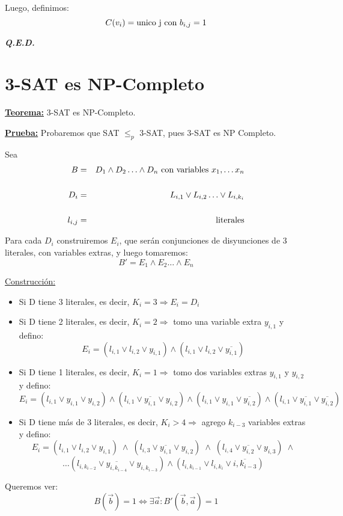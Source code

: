 \documentclass[12pt,a4paper]{report}
\newcommand{\QED}{\hfill \textit{\textbf{Q.E.D.}}}
\begin{document}
				\vspace{3mm}
				\par Luego, definimos:
				\[ C(v_{i}) = \textup{unico j con } b_{i, j} = 1\]

		\QED

	\section{3-SAT es NP-Completo}
		\textbf{\underline{Teorema:}} 3-SAT es NP-Completo.

		\textbf{\underline{Prueba:}} Probaremos que SAT $\leq_{p}$ 3-SAT, pues 3-SAT es NP Completo.

			\vspace{3mm}
			\par Sea
			\begin{eqnarray}
				B &=& D_{1} \wedge D_{2} \dotsc \wedge D_{n} \textup{ con variables } x_{1}, \dotsc x_{n} \\
				\nonumber \\
				D_{i} &=& L_{i, 1} \vee L_{i, 2} \dotsc \vee L_{i, k_{i}} \\
				\nonumber \\
				l_{i, j} &=& \textup{literales}
			\end{eqnarray}
			\par Para cada $D_{i}$ construiremos $E_{i}$, que serán conjunciones de disyunciones de 3 literales, con variables extras, y luego tomaremos:
			\[ B' = E_{1} \wedge E_{2} \dotsc \wedge E_{n} \]

			\underline{Construcción:}
			\begin{itemize}
				\item Si D tiene 3 literales, es decir, $K_{i} = 3 \Rightarrow E_{i} = D_{i}$
				\item Si D tiene 2 literales, es decir, $K_{i} = 2 \Rightarrow$ tomo una variable extra $y_{i, 1}$ y defino:
					\[ E_{i} = (l_{i, 1} \vee l_{i, 2} \vee y_{i, 1}) \wedge (l_{i, 1} \vee l_{i, 2} \vee \overline{y_{i, 1}}) \]
				\item Si D tiene 1 literales, es decir, $K_{i} = 1 \Rightarrow$ tomo dos variables extras $y_{i, 1}$ y $y_{i, 2}$ y defino:
					\[ E_{i} = (l_{i, 1} \vee y_{i, 1} \vee y_{i, 2}) \wedge (l_{i, 1} \vee \overline{y_{i, 1}} \vee y_{i, 2}) \wedge (l_{i, 1} \vee y_{i, 1} \vee \overline{y_{i, 2}}) \wedge (l_{i, 1} \vee \overline{y_{i, 1}} \vee \overline{y_{i, 2}}) \]
				\item Si D tiene más de 3 literales, es decir, $K_{i} > 4 \Rightarrow$ agrego $k_{i-3}$ variables extras y defino:
					\[ E_{i} = (l_{i, 1} \vee l_{i, 2} \vee y_{i, 1}) \; \wedge \; (l_{i, 3} \vee \overline{y_{i, 1}} \vee y_{i, 2}) \; \wedge \; (l_{i, 4} \vee \overline{y_{i, 2}} \vee y_{i, 3}) \; \wedge \]
					\[ \dotsc (l_{i, k_{i-2}} \vee \overline{y_{i, k_{i-4}}} \vee y_{i, k_{i-3}}) \wedge (l_{i, k_{i-1}} \vee l_{i, k_{i}} \vee \overline{i, k_{i-3}}) \]
			\end{itemize}
			\par Queremos ver:
			\[ B(\overrightarrow{b}) = 1 \Leftrightarrow \exists \overrightarrow{a} : B'(\overrightarrow{b}, \overrightarrow{a}) = 1 \]
\end{document}
